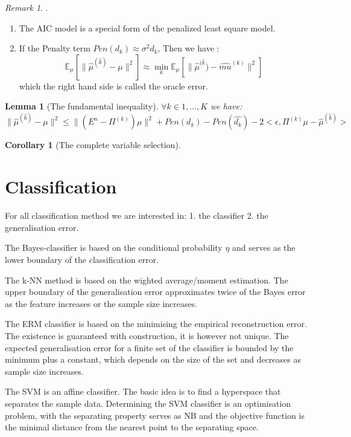 \documentclass[a4paper,12pt, oneside, fleqn]{book}
\newtheorem{corollary}{Corollary}[theorem]
\newtheorem{lemma}[theorem]{Lemma}
\theoremstyle{definition}
\theoremstyle{remark}
\newtheorem*{remark}{Remark}
\begin{document}
\begin{remark}.
\begin{enumerate}
    \item The AIC model is a special form of the penalized least square model. 
    \item If the Penalty term $Pen(d_k) \approx \sigma^2 d_k$, Then we have :
    \begin{equation}
        \mathbb{E}_{\mu}[\| \hat{\mu}^{(\hat{k})} - \mu \|^2] \approx \min_k \mathbb{E}_{\mu}[\| \hat{\mu}^{(\hat{k}}) - \hat{mu}^{(k)} \|^2]
    \end{equation}
    which the right hand side is called the oracle error.
\end{enumerate}
\end{remark}

\begin{lemma}[The fundamental inequality]
$\forall k \in {1, \dots, K}$ we have:
\begin{equation}
    \| \hat{\mu}^{(\hat{k})} - \mu \|^2 \leq \| (E^n - \Pi^{(k)}) \mu\|^2 + Pen(d_k) - Pen(\hat{d_k}) - 2<\epsilon, \Pi^{(k)}\mu - \hat{\mu}^{(\hat{k})}>
\end{equation}
\end{lemma}

\begin{corollary}[The complete variable selection]
\end{corollary}



\section{Classification}
For all classification method we are interested in: 1. the classifier 2. the generalisation error. \par 
The Bayes-classifier is based on the conditional probability $\eta$ and serves as the lower boundary of the classification error.\par 
The k-NN method is based on the wighted average/moment estimation. The upper boundary of the generalisation error approximates twice of the Bayes error as the feature increases or the sample size increases. \par 
The ERM classifier is based on the minimising the empirical reconstruction error. The existence is guaranteed with construction, it is however not unique. The expected generalisation error for a finite set of the classifier is bounded by the minimum plus a constant, which depends on the size of the set and decreases as sample size increases. \par 
The SVM is an affine classifier. The basic idea is to find a hyperspace that separates the sample data. Determining the SVM classifier is an optimisation problem, with the separating property serves as NB and the objective function is the minimal distance from the nearest point to the separating space.
\end{document}
